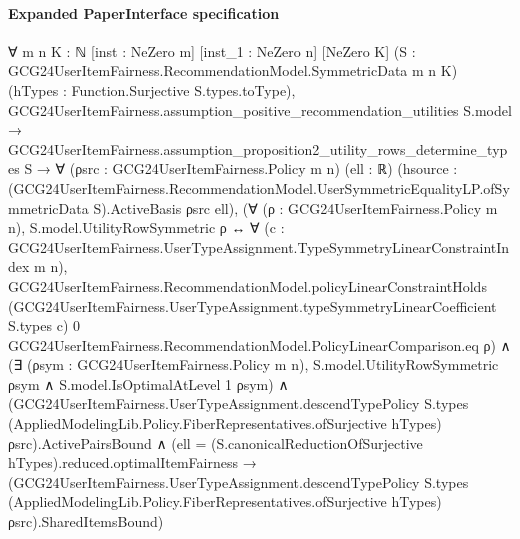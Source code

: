\documentclass[10pt]{article}
\begin{document}
\paragraph{Expanded PaperInterface specification}
\begin{ReviewVerbatim}
∀ {m n K : ℕ} [inst : NeZero m] [inst_1 : NeZero n] [NeZero K]
  (S : GCG24UserItemFairness.RecommendationModel.SymmetricData m n K) (hTypes : Function.Surjective S.types.toType),
  GCG24UserItemFairness.assumption_positive_recommendation_utilities S.model →
    GCG24UserItemFairness.assumption_proposition2_utility_rows_determine_types S →
      ∀ (ρsrc : GCG24UserItemFairness.Policy m n) (ell : ℝ)
        (hsource :
          (GCG24UserItemFairness.RecommendationModel.UserSymmetricEqualityLP.ofSymmetricData S).ActiveBasis ρsrc ell),
        (∀ (ρ : GCG24UserItemFairness.Policy m n),
            S.model.UtilityRowSymmetric ρ ↔
              ∀ (c : GCG24UserItemFairness.UserTypeAssignment.TypeSymmetryLinearConstraintIndex m n),
                GCG24UserItemFairness.RecommendationModel.policyLinearConstraintHolds
                  (GCG24UserItemFairness.UserTypeAssignment.typeSymmetryLinearCoefficient S.types c) 0
                  GCG24UserItemFairness.RecommendationModel.PolicyLinearComparison.eq ρ) ∧
          (∃ (ρsym : GCG24UserItemFairness.Policy m n),
              S.model.UtilityRowSymmetric ρsym ∧ S.model.IsOptimalAtLevel 1 ρsym) ∧
            (GCG24UserItemFairness.UserTypeAssignment.descendTypePolicy S.types
                  (AppliedModelingLib.Policy.FiberRepresentatives.ofSurjective hTypes) ρsrc).ActivePairsBound ∧
              (ell = (S.canonicalReductionOfSurjective hTypes).reduced.optimalItemFairness →
                (GCG24UserItemFairness.UserTypeAssignment.descendTypePolicy S.types
                    (AppliedModelingLib.Policy.FiberRepresentatives.ofSurjective hTypes) ρsrc).SharedItemsBound)
\end{ReviewVerbatim}
\end{document}
